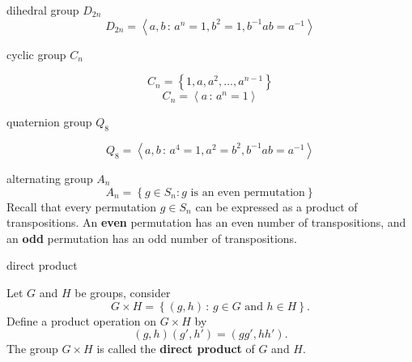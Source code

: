 \documentclass[avery5371,grid]{flashcards}
\newcommand{\set}[2]{\ensuremath{\left\{ #1 \, : \, #2 \right\}}}
\newcommand{\presentation}[2]{\ensuremath{\left< #1 \, : \, #2 \right>}}
\newcommand{\defn}[1]{\textbf{#1}}
\begin{document}
\begin{flashcard}[Definition]{dihedral group $D_{2n}$}
  \[
    D_{2n} = \presentation{a,b}{a^n=1, b^2=1, b^{-1}ab=a^{-1}}
  \]

\end{flashcard}

\begin{flashcard}[Definition]{cyclic group $C_n$}

  \[
    C_n = \left\{ 1, a, a^2, \ldots, a^{n-1} \right\}
  \]
  \[
    C_n = \presentation{a}{a^n=1}
  \]

\end{flashcard}

\begin{flashcard}[Definition]{quaternion group $Q_8$}

  \[
    Q_8 = \presentation{a,b}{a^4 = 1, a^2 = b^2, b^{-1}ab = a^{-1}}
  \]

\end{flashcard}

\begin{flashcard}[Definition]{alternating group $A_n$}
  \[
    A_n = \left\{ g \in S_n : g \text{ is an even permutation} \right\}
  \]
  Recall that every permutation $g \in S_n$ can be expressed as a
  product of transpositions. An \defn{even} permutation has an even
  number of transpositions, and an \defn{odd} permutation has an odd
  number of transpositions.

\end{flashcard}

\begin{flashcard}[Definition]{direct product}

  Let $G$ and $H$ be groups, consider
  \[
    G \times H = \set{(g,h)}{g \in G \text{ and } h \in H}.
  \]
  Define a product operation on $G \times H$ by
  \[
    (g,h)(g',h') = (gg', hh').
  \]
  The group $G \times H$ is called the \defn{direct product} of $G$ and
  $H$.

\end{flashcard}
\end{document}
